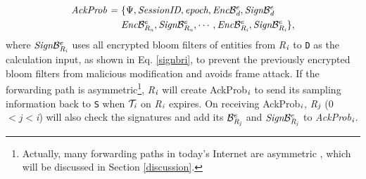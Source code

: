 \iffalse
\begin{equation}\label{ackprobarchitecture}
    \xi_{\emph{max}}^\emph{e} ~\emph{=}~ \emph{max}\{\xi_\emph{1}^\emph{e},~\cdots, ~\xi_\emph{n}^\emph{e}, ~\xi_\emph{D}^\emph{e}\},~~~~0<\xi_{\emph{max}}^\emph{e}<1
\end{equation}
\fi
\iffalse
\begin{equation}\label{reqprob}
\emph{REQPKT =}~ \{\emph{Path}, \emph{SessionID}, \emph{Epoch}, \emph{M}_{\emph{Path}}^{\emph{req}}\}
\end{equation}
\emph{M}$_\emph{i}^{\emph{req}}$ and \emph{M}$_\emph{D}^{\emph{req}}$ can be obtained according to Eq. \ref{mid}.
\begin{equation}\label{mreqpath}
    \emph{M}_{\emph{Path}}^{\emph{req}} ~\emph{=}~ \left \langle \emph{M}_\emph{1}^{\emph{req}}, \emph{M}_\emph{2}^{\emph{req}}, \cdots, \emph{M}_\emph{n}^{\emph{req}}, \emph{M}_\emph{\emph{\emph{D}}}^{\emph{req}} \right \rangle
\end{equation}
\fi
\begin{equation}\label{ackprobforwarding}
\begin{split}
\emph{AckProb}~\emph{=}~& \{\Psi, \emph{SessionID}, \emph{epoch}, \emph{Enc}\mathcal{B}_\emph{d}^e, \emph{Sign}\mathcal{B}_\emph{d}^e \\
                &\emph{Enc}\mathcal{B}_{\emph{R}_\emph{n}}^e, \emph{Sign}\mathcal{B}_{\emph{R}_\emph{n}}^e, \cdots, \emph{Enc}\mathcal{B}_{\emph{R}_\emph{i}}^e, \emph{Sign}\mathcal{B}_{\emph{R}_\emph{i}}^e\},
\end{split}
\end{equation}
where $\emph{Sign}\mathcal{B}_{\emph{R}_\emph{i}}^e$ uses all encrypted bloom filters of entities from \emph{R}$_\emph{i}$ to {\tt D} as the calculation input, as shown in Eq. \ref{signbri}, to prevent the previously encrypted bloom filters from malicious modification and avoids frame attack.
If the forwarding path is asymmetric\footnote{Actually, many forwarding paths in today's Internet are asymmetric \cite{john2010estimating}, which will be discussed in Section \ref{discussion}.}, \emph{R}$_\emph{i}$ will create AckProb$_\emph{i}$ to send its sampling information back to {\tt S} when $\mathcal{T}_\emph{i}$ on \emph{R}$_\emph{i}$ expires. On receiving AckProb$_\emph{i}$, \emph{R}$_\emph{j}$ (0$<j<$\emph{i}) will also check the signatures and add its $\mathcal{B}_{\emph{R}_\emph{j}}^e$ and $\emph{Sign}\mathcal{B}_{\emph{R}_\emph{j}}^e$ to \emph{AckProb}$_\emph{i}$.
